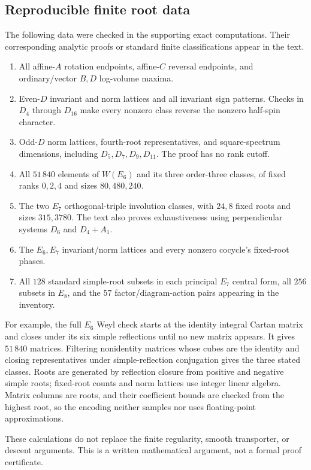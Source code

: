 \documentclass[11pt,a4paper]{article}
\theoremstyle{definition}
\theoremstyle{remark}
\begin{document}
\subsection{Reproducible finite root data}
The following data were checked in the supporting exact computations.
Their corresponding analytic proofs or standard finite
classifications appear in the text.
\begin{enumerate}
\item All affine-\(A\) rotation endpoints, affine-\(C\) reversal
endpoints, and ordinary/vector \(B,D\) log-volume maxima.
\item Even-\(D\) invariant and norm lattices and all invariant sign
patterns. Checks in \(D_4\) through \(D_{16}\) make every nonzero
class reverse the nonzero half-spin character.
\item Odd-\(D\) norm lattices, fourth-root representatives, and
square-spectrum dimensions, including \(D_5,D_7,D_9,D_{11}\).
The proof has no rank cutoff.
\item All \(51\,840\) elements of \(W(E_6)\) and its three
order-three classes, of fixed ranks \(0,2,4\) and sizes
\(80,480,240\).
\item The two \(E_7\) orthogonal-triple involution classes, with
\(24,8\) fixed roots and sizes \(315,3780\).
The text also proves exhaustiveness using perpendicular systems
\(D_6\) and \(D_4+A_1\).
\item The \(E_6,E_7\) invariant/norm lattices and every nonzero
cocycle's fixed-root phases.
\item All \(128\) standard simple-root subsets in each principal
\(E_7\) central form, all \(256\) subsets in \(E_8\), and the
\(57\) factor/diagram-action pairs appearing in the inventory.
\end{enumerate}

For example, the full \(E_6\) Weyl check starts at the identity
integral Cartan matrix and closes under its six simple reflections
until no new matrix appears. It gives \(51\,840\) matrices.
Filtering nonidentity matrices whose cubes are the identity and
closing representatives under simple-reflection conjugation gives
the three stated classes. Roots are generated by reflection closure
from positive and negative simple roots; fixed-root counts and norm
lattices use integer linear algebra. Matrix columns are roots, and
their coefficient bounds are checked from the highest root, so the
encoding neither samples nor uses floating-point approximations.

These calculations do not replace the finite regularity, smooth
transporter, or descent arguments. This is a written mathematical
argument, not a formal proof certificate.
\end{document}

